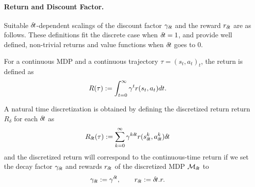 



\paragraph{Return and Discount Factor.}
Suitable 
${\delta\hspace{-.1em}t}$-dependent scalings of the discount factor $\gamma_{\delta\hspace{-.1em}t}$
and the reward $r_{\delta\hspace{-.1em}t}$ are as follows. These definitions fit the discrete case
when ${\delta\hspace{-.1em}t}=1$, and provide well defined, non-trivial returns
and value functions when ${\delta\hspace{-.1em}t}$ goes to $0$.

For a continuous MDP and a continuous trajectory $\tau = (s_t, a_t)_t$,
the return is defined as~\cite{cont_rl}
\begin{equation}
\label{eq:continuous-return}
R(\tau) \mathrel{\mathop{:}}= \int_{t=0}^\infty\gamma^tr(s_t, a_t)dt.
\end{equation}

A natural time discretization is obtained  by defining the discretized return
return $R_\delta$ for each ${\delta\hspace{-.1em}t}$ as
\begin{equation}
\label{eq:discretized-return}
R_{\delta\hspace{-.1em}t}(\tau) \mathrel{\mathop{:}}= \sum_{k=0}^\infty\gamma^{k{\delta\hspace{-.1em}t}}
r(s_{\delta\hspace{-.1em}t}^k, a_{\delta\hspace{-.1em}t}^k){\delta\hspace{-.1em}t}
\end{equation}
and the discretized return will correspond to the continuous-time return
if we set the decay factor $\gamma_{\delta\hspace{-.1em}t}$ and rewards $r_{\delta\hspace{-.1em}t}$ of
the discretized MDP ${\cal M}_{\delta\hspace{-.1em}t}$ to
\begin{align}
\label{eq:def-gamma}
\gamma_{\delta\hspace{-.1em}t} \mathrel{\mathop{:}}= \gamma^{\delta\hspace{-.1em}t},\qquad
r_{\delta\hspace{-.1em}t} \mathrel{\mathop{:}}= {\delta\hspace{-.1em}t} . r.
\end{align}


